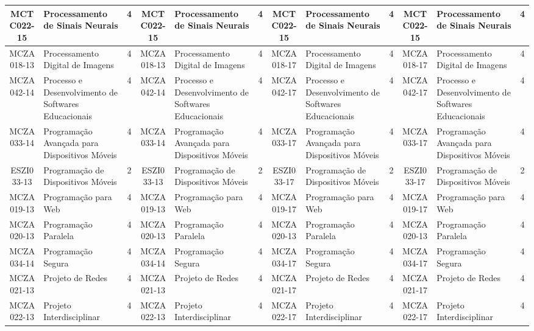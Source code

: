 \begin{landscape}
{\begin{longtable}{|c|p{.2\textheight}|c||c|p{.2\textheight}|c||c|p{.2\textheight}|c||c|p{.2\textheight}|c|}
MCTC022-15 & Processamento de Sinais Neurais & 4 &
MCTC022-15 & Processamento de Sinais Neurais & 4 &
MCTC022-15 & Processamento de Sinais Neurais & 4 &
MCTC022-15 & Processamento de Sinais Neurais & 4\\ \hline

MCZA018-13 & Processamento Digital de Imagens & 4 &
MCZA018-13 & Processamento Digital de Imagens & 4 &
MCZA018-17 & Processamento Digital de Imagens & 4 &
MCZA018-17 & Processamento Digital de Imagens & 4\\ \hline

MCZA042-14 & Processo e Desenvolvimento de Softwares Educacionais & 4 &
MCZA042-14 & Processo e Desenvolvimento de Softwares Educacionais & 4 &
MCZA042-17 & Processo e Desenvolvimento de Softwares Educacionais & 4 & 
MCZA042-17 & Processo e Desenvolvimento de Softwares Educacionais & 4\\ \hline

MCZA033-14 & Programação Avançada para Dispositivos Móveis & 4 &
MCZA033-14 & Programação Avançada para Dispositivos Móveis & 4 &
MCZA033-17 & Programação Avançada para Dispositivos Móveis & 4 & 
MCZA033-17 & Programação Avançada para Dispositivos Móveis & 4\\ \hline

ESZI033-13 & Programação de Dispositivos Móveis & 2 &
ESZI033-13 & Programação de Dispositivos Móveis & 2 &
ESZI033-17 & Programação de Dispositivos Móveis & 2 &
ESZI033-17 & Programação de Dispositivos Móveis & 2\\ \hline

MCZA019-13 & Programação para Web & 4 &
MCZA019-13 & Programação para Web & 4 &
MCZA019-17 & Programação para Web & 4 &
MCZA019-17 & Programação para Web & 4\\ \hline

MCZA020-13 & Programação Paralela & 4 &
MCZA020-13 & Programação Paralela & 4 &
MCZA020-13 & Programação Paralela & 4 & 
MCZA020-13 & Programação Paralela & 4\\ \hline

MCZA034-14 & Programação Segura & 4 &
MCZA034-14 & Programação Segura & 4 &
MCZA034-17 & Programação Segura & 4 &
MCZA034-17 & Programação Segura & 4\\ \hline

MCZA021-13 & Projeto de Redes & 4 &
MCZA021-13 & Projeto de Redes & 4 &
MCZA021-17 & Projeto de Redes & 4 &
MCZA021-17 & Projeto de Redes & 4\\ \hline

MCZA022-13 & Projeto Interdisciplinar & 4 &
MCZA022-13 & Projeto Interdisciplinar & 4 &
MCZA022-17 & Projeto Interdisciplinar & 4 & 
MCZA022-17 & Projeto Interdisciplinar & 4\\ \hline


\end{longtable}}
\end{landscape}
